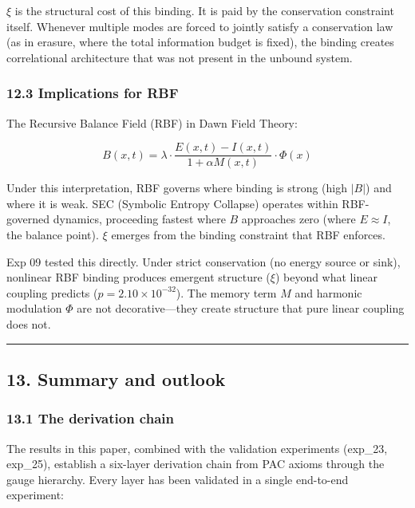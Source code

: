 \documentclass[
  11pt,
  a4paper]{article}
\begin{document}
\(\xi\) is the structural cost of this binding. It is paid by the
conservation constraint itself. Whenever multiple modes are forced to
jointly satisfy a conservation law (as in erasure, where the total
information budget is fixed), the binding creates correlational
architecture that was not present in the unbound system.

\subsubsection{12.3 Implications for RBF}\label{implications-for-rbf}

The Recursive Balance Field (RBF) in Dawn Field Theory:

\[B(x,t) = \lambda \cdot \frac{E(x,t) - I(x,t)}{1 + \alpha M(x,t)} \cdot \Phi(x)\]

Under this interpretation, RBF governs where binding is strong (high
\(|B|\)) and where it is weak. SEC (Symbolic Entropy Collapse) operates
within RBF-governed dynamics, proceeding fastest where \(B\) approaches
zero (where \(E \approx I\), the balance point). \(\xi\) emerges from
the binding constraint that RBF enforces.

Exp 09 tested this directly. Under strict conservation (no energy source
or sink), nonlinear RBF binding produces emergent structure (\(\xi\))
beyond what linear coupling predicts (\(p = 2.10 \times 10^{-32}\)). The
memory term \(M\) and harmonic modulation \(\Phi\) are not
decorative---they create structure that pure linear coupling does not.

\begin{center}\rule{0.5\linewidth}{0.5pt}\end{center}

\subsection{13. Summary and outlook}\label{summary-and-outlook}

\subsubsection{13.1 The derivation chain}\label{the-derivation-chain}

The results in this paper, combined with the validation experiments
(exp\_23, exp\_25), establish a six-layer derivation chain from PAC
axioms through the gauge hierarchy. Every layer has been validated in a
single end-to-end experiment:
\end{document}

